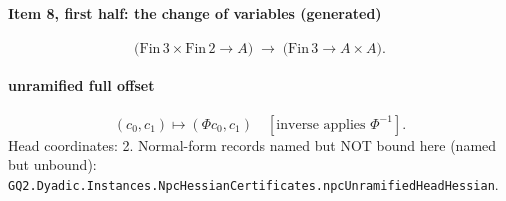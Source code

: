 \paragraph{Item 8, first half: the change of variables (generated)}
\[\bigl(\mathrm{Fin}\,3\times\mathrm{Fin}\,2\to A\bigr)\;\longrightarrow\;\bigl(\mathrm{Fin}\,3\to A\times A\bigr).\]
\paragraph{unramified full offset}
\[(c_0,c_1)\mapsto(\Phi c_0,c_1)\quad[\text{inverse applies }\Phi^{-1}].\]
Head coordinates: 2. Normal-form records named but NOT bound here (named but unbound): \texttt{GQ2.Dyadic.Instances.NpcHessianCertificates.npcUnramifiedHeadHessian}.
